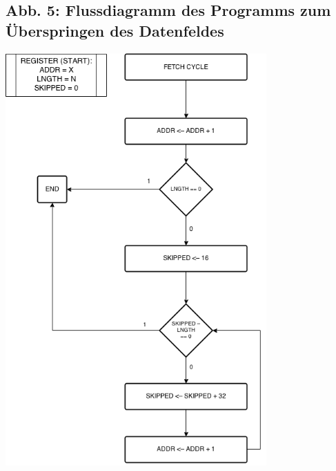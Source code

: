 \documentclass[12pt,titlepage]{article}
\begin{document}
\subsection{Abb. 5: Flussdiagramm des Programms zum Überspringen des Datenfeldes}
\includegraphics[width=10cm]{skipBits.png}
\end{document}
